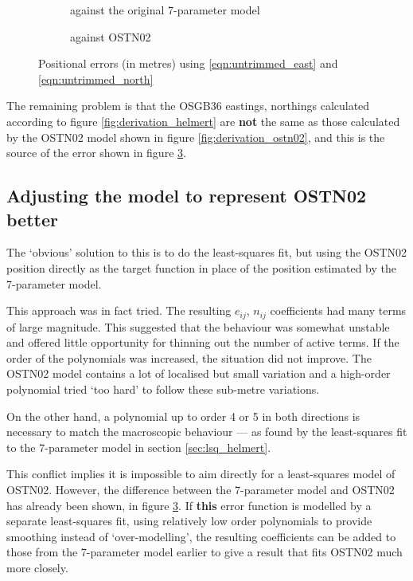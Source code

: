 \documentclass[10pt,a4paper]{article}
\def\gap{\hspace{2cm}}
\begin{document}
\begin{figure}[htb]
  \begin{subfigure}[b]{0.4\textwidth}
  \centering
  \fbox{
    
  }
  \caption{against the original 7-parameter model}
  \label{fig:untrimmed_v_7param}
\end{subfigure}
\gap
  \begin{subfigure}[b]{0.4\textwidth}
  \centering
  \fbox{
    
  }
  \caption{against OSTN02}
  \label{fig:untrimmed_v_ostn02}
\end{subfigure}
  \caption{Positional errors (in metres) using \eqref{eqn:untrimmed_east} and \eqref{eqn:untrimmed_north}}
\hrulefill
\end{figure}

The remaining problem is that the OSGB36 eastings, northings calculated
according to figure \ref{fig:derivation_helmert} are \textbf{not} the same as
those calculated by the OSTN02 model shown in figure
\ref{fig:derivation_ostn02}, and this is the source of the error shown in
figure \ref{fig:untrimmed_v_ostn02}.

\subsection{Adjusting the model to represent OSTN02 better}

The `obvious' solution to this is to do the least-squares fit, but using the
OSTN02 position directly as the target function in place of the position
estimated by the 7-parameter model.

This approach was in fact tried.  The resulting $e_{ij}$, $n_{ij}$ coefficients
had many terms of large magnitude.  This suggested that the behaviour was
somewhat unstable and offered little opportunity for thinning out the number of
active terms.  If the order of the polynomials was increased, the situation did
not improve.  The OSTN02 model contains a lot of localised but small variation
and a high-order polynomial tried `too hard' to follow these sub-metre
variations.

On the other hand, a polynomial up to order 4 or 5 in both directions is
necessary to match the macroscopic behaviour --- as found by the least-squares
fit to the 7-parameter model in section \ref{sec:lsq_helmert}.

This conflict implies it is impossible to aim directly for a least-squares
model of OSTN02.  However, the difference between the 7-parameter model and
OSTN02 has already been shown, in figure \ref{fig:untrimmed_v_ostn02}.  If
\textbf{this} error function is modelled by a separate least-squares fit, using
relatively low order polynomials to provide smoothing instead of
`over-modelling', the resulting coefficients can be added to those from the
7-parameter model earlier to give a result that fits OSTN02 much more closely.
\end{document}
